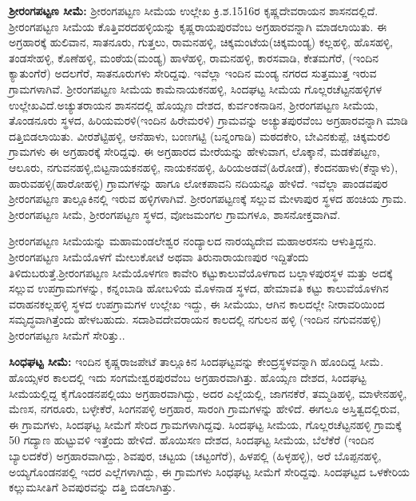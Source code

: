 \textbf{ಶ‍್ರೀರಂಗಪಟ್ಟಣ ಸೀಮೆ:} ಶ‍್ರೀರಂಗಪಟ್ಟಣ ಸೀಮೆಯ ಉಲ್ಲೇಖ ಕ್ರಿ.ಶ.1516ರ ಕೃಷ್ಣದೇವರಾಯನ ಶಾಸನದಲ್ಲಿದೆ. ಶ‍್ರೀರಂಗಪಟ್ಟಣ ಸೀಮೆಯ ಕೊತ್ತಿವರದಹಳ್ಳಿಯನ್ನು ಕೃಷ್ಣರಾಯಪುರವೆಂಬ ಅಗ್ರಹಾರವನ್ನಾಗಿ ಮಾಡಲಾಯಿತು. ಈ ಅಗ್ರಹಾರಕ್ಕೆ ಹುಲಿವಾನ, ಸಾತನೂರು, ಗುತ್ತಲು, ರಾಮನಹಳ್ಳಿ, ಚಿಕ್ಕಮಂಟೆಯ(ಚಿಕ್ಕಮಂಡ್ಯ) ಕಲ್ಲಹಳ್ಳಿ, ಹೊಸಹಳ್ಳಿ, ತಂಡಸೇಹಳ್ಳಿ, ಕೊಣೆಹಳ್ಳಿ, ಮಂಠೆಯ(ಮಂಡ್ಯ) ಹಾಳೆಹಳ್ಳಿ, ರಾಮನಹಳ್ಳಿ, ಕಾರಸವಾಡಿ, ಕೇತಮಗೆರೆ, (ಇಂದಿನ ಕ್ಯಾತುಂಗೆರೆ) ಅದಲಗೆರೆ, ಸಾತನೂರುಗಳು ಸೇರಿದ್ದವು. ಇವೆಲ್ಲಾ ಇಂದಿನ ಮಂಡ್ಯ ನಗರದ ಸುತ್ತಮುತ್ತ ಇರುವ ಗ್ರಾಮಗಳಾಗಿವೆ. ಶ‍್ರೀರಂಗಪಟ್ಟಣ ಸೀಮೆಯ ಕಾಮೆನಾಯಕನಹಳ್ಳಿ, ಸಿಂದಘಟ್ಟ ಸೀಮೆಯ ಗೊಲ್ಲರಚೆಟ್ಟನಹಳ್ಳಿಗಳ ಉಲ್ಲೇಖವಿದೆ.\break ಅಚ್ಯುತರಾಯನ ಶಾಸನದಲ್ಲಿ ಹೊಯ್ಸಣ ದೇಶದ, ಕುರ್ವಂಕನಾಡಿನ, ಶ‍್ರೀರಂಗಪಟ್ಟಣ ಸೀಮೆಯ, ತೊಂಡನೂರು ಸ್ಥಳದ, ಹಿರಿಯಮರಳಿ(ಇಂದಿನ ಹಿರೇಮರಳಿ) ಗ್ರಾಮವನ್ನು ಅಚ್ಯುತಪುರವೆಂಬ ಅಗ್ರಹಾರವನ್ನಾಗಿ ಮಾಡಿ ದತ್ತಿಬಿಡಲಾಯಿತು. ವೀರಶೆಟ್ಟಿಹಳ್ಳಿ, ಆನೆಹಾಳು, ಬಂಣಗಟ್ಟಿ (ಬನ್ನಂಗಾಡಿ) ಮಠದಕೇರಿ, ಬೇವಿನಕುಪ್ಪೆ, ಚಿಕ್ಕಮರಲಿ ಗ್ರಾಮಗಳು ಈ ಅಗ್ರಹಾರಕ್ಕೆ ಸೇರಿದ್ದವು. ಈ ಅಗ್ರಹಾರದ ಮೇರೆಯನ್ನು ಹೇಳುವಾಗ, ಲೊಕ್ಕಾನೆ, ಮಡಕೆಪಟ್ಟಣ, ಆಲೂರು, ನಗುವನಹಳ್ಳಿ,\break ಬಿಟ್ಟನಾಯಕನಹಳ್ಳಿ, ನಾಯಕನಹಳ್ಳಿ, ಹಿರಿಯಅಡವೆ(ಹಿರೋಡೆ), ಕೆಂದನಹಾಳು(ಕೆನ್ನಾಳು), ಹಾರುವಹಳ್ಳಿ(ಹಾರೋಹಳ್ಳಿ) ಗ್ರಾಮಗಳನ್ನು ಹಾಗೂ ಲೋಕಪಾವನಿ ನದಿಯನ್ನೂ ಹೇಳಿದೆ. ಇವೆಲ್ಲಾ ಪಾಂಡವಪುರ ಶ‍್ರೀರಂಗಪಟ್ಟಣ ತಾಲ್ಲೂಕಿನಲ್ಲಿ ಇರುವ ಹಳ್ಳಿಗಳಾಗಿವೆ. ಶ‍್ರೀರಂಗಪಟ್ಟಣಕ್ಕೆ ಸಲ್ಲುವ ಮೇಳಾಪುರ ಸ್ಥಳದ ಹಂಚಿಯ ಗ್ರಾಮ. ಶ‍್ರೀರಂಗಪಟ್ಟಣ ಸೀಮೆ, ಶ‍್ರೀರಂಗಪಟ್ಟಣ ಸ್ಥಳದ, ವೋಜಮಂಗಲ ಗ್ರಾಮಗಳೂ, ಶಾಸನೋಕ್ತವಾಗಿವೆ.

ಶ‍್ರೀರಂಗಪಟ್ಟಣ ಸೀಮೆಯನ್ನು ಮಹಾಮಂಡಲೇಶ್ವರ ನಂದ್ಯಾಲದ ನಾರಯ್ಯದೇವ ಮಹಾಅರಸನು ಆಳುತ್ತಿದ್ದನು. ಶ‍್ರೀರಂಗಪಟ್ಟಣ ಸೀಮೆಯೊಳಗೆ ಮೇಲುಕೋಟೆ ಅಥವಾ ತಿರುನಾರಾಯಣಪುರ ಇದ್ದಿತೆಂದು ತಿಳಿದುಬರುತ್ತೆ.\break ಶ‍್ರೀರಂಗಪಟ್ಟಣ ಸೀಮೆಯೊಳಗಣ ಕಾವೇರಿ ಕಟ್ಟುಕಾಲುವೆಯೊಳಗಾದ ಬಲ್ಲಾಳಪುರಸ್ಥಳ ಮತ್ತು ಅದಕ್ಕೆ ಸಲ್ಲುವ ಉಪಗ್ರಾಮ\-ಗಳನ್ನು, ಕನ್ನಂಬಾಡಿ ಹೋಬಳಿಯ ಮೊಳನಾಡ ಸ್ಥಳದ, ಹೇಮಾವತಿ ಕಟ್ಟು ಕಾಲುವೆಯೊಳಗಿನ ವರಾಹನಕಲ್ಲಹಳ್ಳಿ ಸ್ಥಳದ ಉಪಗ್ರಾಮ\-ಗಳ ಉಲ್ಲೇಖ ಇದ್ದು, ಈ ಸೀಮೆಯು, ಆಗಿನ ಕಾಲದಲ್ಲೇ ನೀರಾವರಿಯಿಂದ ಸಮೃದ್ಧವಾಗಿತ್ತೆಂದು ಹೇಳ\-ಬಹುದು. ಸದಾಶಿವದೇವರಾಯನ ಕಾಲದಲ್ಲಿ ನಗುಲನ ಹಳ್ಳಿ (ಇಂದಿನ ನಗುವನಹಳ್ಳಿ) ಶ‍್ರೀರಂಗಪಟ್ಟಣ ಸೀಮೆಗೆ ಸೇರಿತ್ತು..

\newpage

\textbf{ಸಿಂಧಘಟ್ಟ ಸೀಮೆ:} ಇಂದಿನ ಕೃಷ್ಣರಾಜಪೇಟೆ ತಾಲ್ಲೂಕಿನ ಸಿಂದಘಟ್ಟವನ್ನು ಕೇಂದ್ರಸ್ಥಳವನ್ನಾಗಿ ಹೊಂದಿದ್ದ ಸೀಮೆ. ಹೊಯ್ಸಳರ ಕಾಲದಲ್ಲಿ ಇದು ಸಂಗಮೇಶ್ವರಪುರವೆಂಬ ಅಗ್ರಹಾರವಾಗಿತ್ತು. ಹೊಯ್ಸಣ ದೇಶದ, ಸಿಂದಘಟ್ಟ ಸೀಮೆಯಲ್ಲಿದ್ದ ಕೈಗೊಂಡನಪಲ್ಲಿಯು ಅಗ್ರಹಾರವಾಗಿದ್ದು, ಅದರ ಎಲ್ಲೆಯಲ್ಲಿ, ಜಾಗನಕೆರೆ, ತಮ್ಮಡಿಹಳ್ಳಿ, ಮಾಳೇನಹಳ್ಳಿ, ಮೆಣಸ, ನಗರೂರು, ಬಳ್ಳೇಕೆರೆ, ಸಿಂಗನಪಳ್ಳಿ ಅಗ್ರಹಾರ, ಸಾರಂಗಿ ಗ್ರಾಮಗಳನ್ನು ಹೇಳಿದೆ. ಈಗಲೂ ಅಸ್ತಿತ್ವದಲ್ಲಿರುವ, ಈ ಗ್ರಾಮಗಳು, ಸಿಂದಘಟ್ಟ ಸೀಮೆಗೆ ಸೇರಿದ ಗ್ರಾಮಗಳಾಗಿದ್ದವು. ಸಿಂದಘಟ್ಟ ಸೀಮೆಯ, ಗೊಲ್ಲರಚೆಟ್ಟನಹಳ್ಳಿ ಗ್ರಾಮಕ್ಕೆ 50 ಗದ್ಯಾಣ ಹುಟ್ಟುವಳಿ ಇತ್ತೆಂದು ಹೇಳಿದೆ. ಹೊಯಿಸಣ ದೇಶದ, ಸಿಂದಘಟ್ಟ ಸೀಮೆಯ, ಬೆಲೆಕೆರೆ (ಇಂದಿನ ಬ್ಯಾಲದಕೆರೆ) ಅಗ್ರಹಾರವಾಗಿದ್ದು, ಶಿವಪುರ, ಚಟ್ಟಯ (ಚಟ್ಟಂಗೆರೆ), ಹಿಳಪಲ್ಲಿ (ಹಿಳ್ಳಹಳ್ಳಿ), ಅರೆ ಬೊಪ್ಪನಹಳ್ಳಿ, ಅಯ್ಯಗೊಂಡನಪಲ್ಲಿ ಇದರ ಎಲ್ಲೆಗಳಾಗಿದ್ದು, ಈ ಗ್ರಾಮಗಳು ಸಿಂಧಘಟ್ಟ ಸೀಮೆಗೆ ಸೇರಿದ್ದವು. ಸಿಂದಘಟ್ಟದ ಒಳಕೇರಿಯ ಕಲ್ಲುಮಸೀತಿಗೆ ಶಿವಪುರವನ್ನು ದತ್ತಿ ಬಿಡಲಾಗಿತ್ತು.

